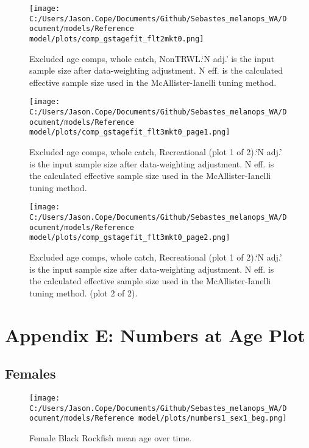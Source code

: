 \documentclass[11pt,
  english,
  letterpaper,
]{article}
\begin{document}
\begin{figure}
\centering
\texttt{[image: C:/Users/Jason.Cope/Documents/Github/Sebastes\_melanops\_WA/Document/models/Reference model/plots/comp\_gstagefit\_flt2mkt0.png]}
\caption{Excluded age comps, whole catch, NonTRWL.`N adj.' is the input sample size after data-weighting adjustment. N eff. is the calculated effective sample size used in the McAllister-Ianelli tuning method.\label{fig:comp_gstagefit_flt2mkt0}}
\end{figure}

\begin{figure}
\centering
\texttt{[image: C:/Users/Jason.Cope/Documents/Github/Sebastes\_melanops\_WA/Document/models/Reference model/plots/comp\_gstagefit\_flt3mkt0\_page1.png]}
\caption{Excluded age comps, whole catch, Recreational (plot 1 of 2).`N adj.' is the input sample size after data-weighting adjustment. N eff. is the calculated effective sample size used in the McAllister-Ianelli tuning method.\label{fig:comp_gstagefit_flt3mkt0_page1}}
\end{figure}

\begin{figure}
\centering
\texttt{[image: C:/Users/Jason.Cope/Documents/Github/Sebastes\_melanops\_WA/Document/models/Reference model/plots/comp\_gstagefit\_flt3mkt0\_page2.png]}
\caption{Excluded age comps, whole catch, Recreational (plot 1 of 2).`N adj.' is the input sample size after data-weighting adjustment. N eff. is the calculated effective sample size used in the McAllister-Ianelli tuning method. (plot 2 of 2).\label{fig:comp_gstagefit_flt3mkt0_page2}}
\end{figure}

\clearpage

\hypertarget{app-e}{%
\section{Appendix E: Numbers at Age Plot}\label{app-e}}

\hypertarget{females}{%
\subsection{Females}\label{females}}

\begin{figure}
\centering
\texttt{[image: C:/Users/Jason.Cope/Documents/Github/Sebastes\_melanops\_WA/Document/models/Reference model/plots/numbers1\_sex1\_beg.png]}
\caption{Female Black Rockfish mean age over time.\label{fig:num_age_females}}
\end{figure}
\end{document}
